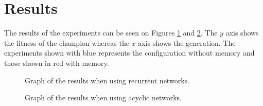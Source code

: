 
\section{Results}
The results of the experiments can be seen on Figures \ref{experiments:graph:1} and \ref{experiments:graph:2}. The $ y $ axis shows the fitness of the champion whereas the $ x $ axis shows the generation. The experiments shown with blue represents the configuration without memory and those shown in red with memory. 

\begin{figure}[ht]
	\caption{Graph of the results when using recurrent networks.}
	\label{experiments:graph:1}
\end{figure}

\begin{figure}[ht]
	\caption{Graph of the results when using acyclic networks.}
	\label{experiments:graph:2}
\end{figure}